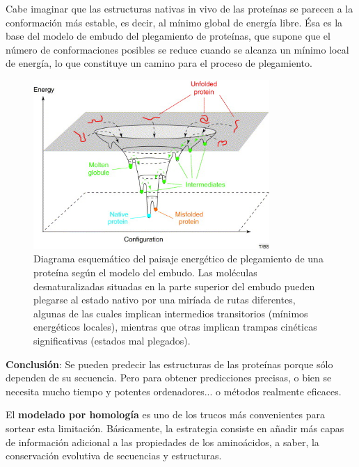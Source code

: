 Cabe imaginar que las estructuras nativas in vivo de las proteínas se parecen a la conformación más estable, es decir, al mínimo global de energía libre. Ésa es la base del modelo de embudo del plegamiento de proteínas, que supone que el número de conformaciones posibles se reduce cuando se alcanza un mínimo local de energía, lo que constituye un camino para el proceso de plegamiento.
\begin{figure}[h]
\centering
\includegraphics[width = 0.8\textwidth]{figs/funnel_1.jpeg}
\caption{Diagrama esquemático del paisaje energético de plegamiento de una proteína según el modelo del embudo. Las moléculas desnaturalizadas situadas en la parte superior del embudo pueden plegarse al estado nativo por una miríada de rutas diferentes, algunas de las cuales implican intermedios transitorios (mínimos energéticos locales), mientras que otras implican trampas cinéticas significativas (estados mal plegados).}
\end{figure}

\begin{table}[htbp]
\begin{mdframed}[backgroundcolor=black!10]
    \centering
    \textbf{Conclusión}: Se pueden predecir las estructuras de las proteínas porque sólo dependen de su secuencia. Pero para obtener predicciones precisas, o bien se necesita mucho tiempo y potentes ordenadores... o métodos realmente eficaces. 
    \end{mdframed}
\end{table}

El \textbf{modelado por homología} es uno de los trucos más convenientes para sortear esta limitación. Básicamente, la estrategia consiste en añadir más capas de información adicional a las propiedades de los aminoácidos, a saber, la conservación evolutiva de secuencias y estructuras.

